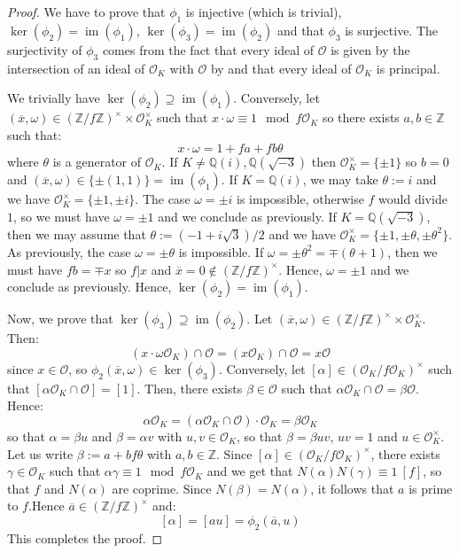 \documentclass[a4paper,10pt]{report}
\theoremstyle{definition}
\theoremstyle{plain}
\theoremstyle{definition}
\newcommand{\Z}{\mathbb{Z}}
\newcommand{\Q}{\mathbb{Q}}
\newcommand{\mO}{\mathcal{O}}
\DeclareMathOperator{\im}{im}
\renewcommand{\(}{\left(}
\renewcommand{\)}{\right)}
\begin{document}
\begin{proof}
We have to prove that $\phi_1$ is injective (which is trivial), $\ker(\phi_2)=\im(\phi_1)$, $\ker(\phi_3)=\im(\phi_2)$ and that $\phi_3$ is surjective. The surjectivity of $\phi_3$ comes from the fact that every ideal of $\mO$ is given by the intersection of an ideal of $\mO_K$ with $\mO$ by \cite[proposition 7.20]{Cox} and that every ideal of $\mO_K$ is principal.

We trivially have $\ker(\phi_2)\supseteq \im(\phi_1)$. Conversely, let $(\overline{x},\omega)\in (\Z/f\Z)^\times\times \mO_K^\times$ such that $x\cdot \omega\equiv 1 \mod f\mO_K$ so there exists $a, b\in\Z$ such that:
\[x\cdot\omega=1+fa+fb\theta\]
where $\theta$ is a generator of $\mO_K$. If $K\neq\Q(i),\Q(\sqrt{-3})$ then $\mO_K^\times=\{\pm 1\}$ so $b=0$ and $(\overline{x},\omega)\in\{\pm(1,1)\}=\im(\phi_1)$. If $K=\Q(i)$, we may take $\theta:=i$ and we have $\mO_K^\times=\{\pm 1, \pm i\}$. The case $\omega=\pm i$ is impossible, otherwise $f$ would divide $1$, so we must have $\omega=\pm 1$ and we conclude as previously. If $K=\Q(\sqrt{-3})$, then we may assume that $\theta:=(-1+i\sqrt{3})/2$ and we have $\mO_K^\times=\{\pm 1, \pm \theta,\pm\theta^2\}$. As previously, the case $\omega=\pm \theta$ is impossible. If $\omega=\pm\theta^2=\mp(\theta+1)$, then we must have $fb=\mp x$ so $f|x$ and $\overline{x}=0\not\in(\Z/f\Z)^\times$. Hence, $\omega=\pm 1$ and we conclude as previously. Hence, $\ker(\phi_2)=\im(\phi_1)$.

Now, we prove that $\ker(\phi_3)\supseteq \im(\phi_2)$. Let $(\overline{x},\omega)\in (\Z/f\Z)^\times\times \mO_K^\times$. Then:
\[(x\cdot\omega\mO_K)\cap\mO=(x\mO_K)\cap\mO=x\mO\]
since $x\in\mO$, so $\phi_2(\overline{x},\omega)\in \ker(\phi_3)$. Conversely, let $[\alpha]\in(\mO_K/f\mO_K)^\times$ such that $[\alpha\mO_K\cap\mO]=[1]$. Then, there exists $\beta\in\mO$ such that $\alpha\mO_K\cap\mO=\beta\mO$. Hence:
\[\alpha\mO_K=(\alpha\mO_K\cap\mO)\cdot\mO_K=\beta\mO_K\]
so that $\alpha=\beta u$ and $\beta=\alpha v$ with $u, v\in\mO_K$, so that $\beta=\beta uv$, $uv=1$ and $u\in\mO_K^\times$. Let us write $\beta:=a+bf\theta$ with $a, b\in\Z$. Since $[\alpha]\in(\mO_K/f\mO_K)^\times$, there exists $\gamma\in\mO_K$ such that $\alpha\gamma\equiv 1 \mod f\mO_K$ and we get that $N(\alpha)N(\gamma)\equiv 1 \ [f]$, so that $f$ and $N(\alpha)$ are coprime.  Since $N(\beta)=N(\alpha)$, it follows that $a$ is prime to $f$.Hence $\overline{a}\in(\Z/f\Z)^\times$ and:
\[[\alpha]=[au]=\phi_2(\overline{a},u)\]
This completes the proof.
\end{proof}
\end{document}
